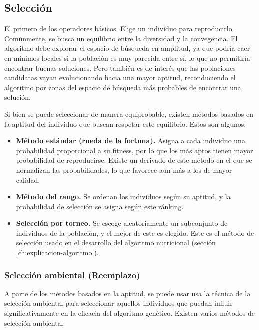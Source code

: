 \subsection{Selección}
\label{Seleccion}

El primero de los operadores básicos. Elige un individuo para reproducirlo. Comúnmente, se busca un equilibrio entre la diversidad y la convegencia. El algoritmo debe explorar el espacio de búsqueda en amplitud, ya que podría caer en mínimos locales si la población es muy parecida entre sí, lo que no permitiría encontrar buenas soluciones. Pero también es de interés que las poblaciones candidatas vayan evolucionando hacia una mayor aptitud, reconduciendo el algoritmo por zonas del espacio de búsqueda más probables de encontrar una solución.

Si bien se puede seleccionar de manera equiprobable, existen métodos basados en la aptitud del individuo que buscan respetar este equilibrio. Estos son algunos:

\begin{itemize}
  \item \textbf{Método estándar (rueda de la fortuna).} Asigna a cada individuo una probabilidad proporcional a su fitness, por lo que los más aptos tienen mayor probabilidad de reproducirse. Existe un derivado de este método en el que se normalizan las probabilidades, lo que favorece aún más a los de mayor calidad.\newpage
  \item \textbf{Método del rango.} Se ordenan los individuos según su aptitud, y la probabilidad de selección se asigna según este ránking.
  \item \textbf{Selección por torneo.} Se escoge aleatoriamente un subconjunto de individuos de la población, y el mejor de este es elegido. Este es el método de selección usado en el desarrollo del algoritmo nutricional (sección \ref{ch:explicacion-algoritmo}).
\end{itemize}

\subsubsection{Selección ambiental (Reemplazo)}

A parte de los métodos basados en la aptitud, se puede usar usa la técnica de la selección ambiental para seleccionar aquellos individuos que puedan influir significativamente en la eficacia del algoritmo genético. Existen varios métodos de selección ambiental:

